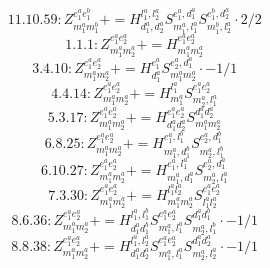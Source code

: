 \documentclass[letterpaper,10pt,fleqn,leqno,onecolumn]{article}
\begin{document}
\begin{equation} \;\;\;\;\;\;  11.10.59: Z^{e_{1}^{a}e_{1}^{b}}_{m_{1}^{a}m_{1}^{b}}+=H^{l_{1}^{a},l_{2}^{a}}_{d_{1}^{a},d_{2}^{a}}S^{e_{1}^{a},d_{1}^{a}}_{m_{1}^{a},l_{1}^{a}}S^{e_{1}^{b},d_{2}^{a}}_{m_{1}^{b},l_{2}^{a}}\cdot 2/2 \end{equation}
\begin{equation} \;\;\;\;\;\;  1.1.1: Z^{e_{1}^{a}e_{2}^{a}}_{m_{1}^{a}m_{2}^{a}}+=H^{e_{1}^{a}e_{2}^{a}}_{m_{1}^{a}m_{2}^{a}} \end{equation}
\begin{equation} \;\;\;\;\;\;  3.4.10: Z^{e_{1}^{a}e_{2}^{a}}_{m_{1}^{a}m_{2}^{a}}+=H^{e_{1}^{a}}_{d_{1}^{a}}S^{e_{2}^{a},d_{1}^{a}}_{m_{1}^{a}m_{2}^{a}}\cdot -1/1 \end{equation}
\begin{equation} \;\;\;\;\;\;  4.4.14: Z^{e_{1}^{a}e_{2}^{a}}_{m_{1}^{a}m_{2}^{a}}+=H^{l_{1}^{a}}_{m_{1}^{a}}S^{e_{1}^{a}e_{2}^{a}}_{m_{2}^{a},l_{1}^{a}} \end{equation}
\begin{equation} \;\;\;\;\;\;  5.3.17: Z^{e_{1}^{a}e_{2}^{a}}_{m_{1}^{a}m_{2}^{a}}+=H^{e_{1}^{a}e_{2}^{a}}_{d_{1}^{a}d_{2}^{a}}S^{d_{1}^{a}d_{2}^{a}}_{m_{1}^{a}m_{2}^{a}} \end{equation}
\begin{equation} \;\;\;\;\;\;  6.8.25: Z^{e_{1}^{a}e_{2}^{a}}_{m_{1}^{a}m_{2}^{a}}+=H^{e_{1}^{a},l_{1}^{b}}_{m_{1}^{a},d_{1}^{b}}S^{e_{2}^{a},d_{1}^{b}}_{m_{2}^{a},l_{1}^{b}} \end{equation}
\begin{equation} \;\;\;\;\;\;  6.10.27: Z^{e_{1}^{a}e_{2}^{a}}_{m_{1}^{a}m_{2}^{a}}+=H^{e_{1}^{a},l_{1}^{a}}_{m_{1}^{a},d_{1}^{a}}S^{e_{2}^{a},d_{1}^{a}}_{m_{2}^{a},l_{1}^{a}} \end{equation}
\begin{equation} \;\;\;\;\;\;  7.3.30: Z^{e_{1}^{a}e_{2}^{a}}_{m_{1}^{a}m_{2}^{a}}+=H^{l_{1}^{a}l_{2}^{a}}_{m_{1}^{a}m_{2}^{a}}S^{e_{1}^{a}e_{2}^{a}}_{l_{1}^{a}l_{2}^{a}} \end{equation}
\begin{equation} \;\;\;\;\;\;  8.6.36: Z^{e_{1}^{a}e_{2}^{a}}_{m_{1}^{a}m_{2}^{a}}+=H^{l_{1}^{a},l_{1}^{b}}_{d_{1}^{a}d_{1}^{b}}S^{e_{1}^{a}e_{2}^{a}}_{m_{1}^{a},l_{1}^{a}}S^{d_{1}^{a}d_{1}^{b}}_{m_{2}^{a},l_{1}^{b}}\cdot -1/1 \end{equation}
\begin{equation} \;\;\;\;\;\;  8.8.38: Z^{e_{1}^{a}e_{2}^{a}}_{m_{1}^{a}m_{2}^{a}}+=H^{l_{1}^{a},l_{2}^{a}}_{d_{1}^{a}d_{2}^{a}}S^{e_{1}^{a}e_{2}^{a}}_{m_{1}^{a},l_{1}^{a}}S^{d_{1}^{a}d_{2}^{a}}_{m_{2}^{a},l_{2}^{a}}\cdot -1/1 \end{equation}
\end{document}
